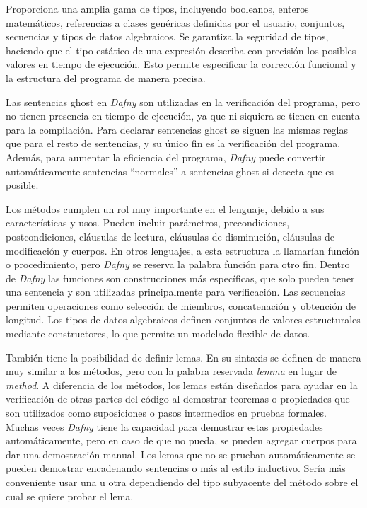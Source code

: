 \documentclass[runningheads]{llncs}
\begin{document}
Proporciona una amplia gama de tipos, incluyendo booleanos, enteros matemáticos, referencias a clases genéricas definidas por el usuario, conjuntos, secuencias y tipos de datos algebraicos.
Se garantiza la seguridad de tipos, haciendo que el tipo estático de una expresión describa con precisión los posibles valores en tiempo de ejecución.
Esto permite especificar la corrección funcional y la estructura del programa de manera precisa.

Las sentencias ghost en \textit{Dafny} son utilizadas en la verificación del programa, pero no tienen presencia en tiempo de ejecución, ya que ni siquiera se tienen en cuenta para la compilación.
Para declarar sentencias ghost se siguen las mismas reglas que para el resto de sentencias, y su único fin es la verificación del programa.
Además, para aumentar la eficiencia del programa, \textit{Dafny} puede convertir automáticamente sentencias ``normales'' a sentencias ghost si detecta que es posible.

Los métodos cumplen un rol muy importante en el lenguaje, debido a sus características y usos.
Pueden incluir parámetros, precondiciones, postcondiciones, cláusulas de lectura, cláusulas de disminución, cláusulas de modificación y cuerpos.
En otros lenguajes, a esta estructura la llamarían función o procedimiento, pero \textit{Dafny} se reserva la palabra función para otro fin.
Dentro de \textit{Dafny} las funciones son construcciones más específicas, que solo pueden tener una sentencia y son utilizadas principalmente para verificación.
Las secuencias permiten operaciones como selección de miembros, concatenación y obtención de longitud.
Los tipos de datos algebraicos definen conjuntos de valores estructurales mediante constructores, lo que permite un modelado flexible de datos.

También tiene la posibilidad de definir lemas. En su sintaxis se definen de manera muy similar a los métodos, pero con la palabra reservada \textit{lemma} en lugar de \textit{method}.
A diferencia de los métodos, los lemas están diseñados para ayudar 
en la verificación de otras partes del código al demostrar teoremas o propiedades que son utilizados como suposiciones o pasos intermedios en pruebas formales.
Muchas veces \textit{Dafny} tiene la capacidad para demostrar estas propiedades automáticamente, pero en caso de que no pueda, se pueden agregar cuerpos para dar una demostración manual.
Los lemas que no se prueban automáticamente se pueden demostrar encadenando sentencias o más al estilo inductivo. Sería más conveniente usar una u otra dependiendo del tipo subyacente del método sobre el cual se quiere probar el lema.
\end{document}
